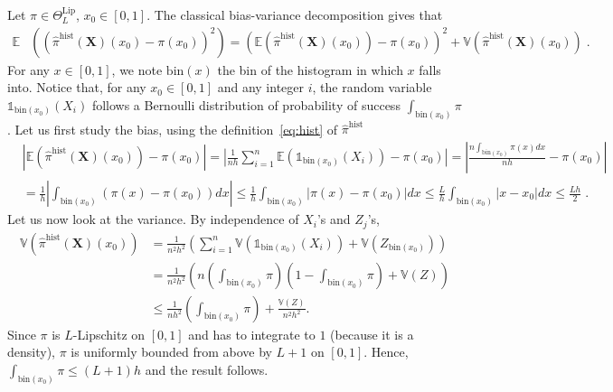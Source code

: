 \documentclass[10pt]{article} %
\def\Ind{\mathds{1}}
\newcommand{\E}[0]{\mathbb{E}}
\newcommand{\V}[0]{\mathbb{V}}
\newcommand\vect[1]{\mathbf{#1}}
\newcommand\p[1]{\left( {#1}\right)}
\newcommand\RG[1]{\textcolor{red}{#1}}
\newcommand\mRG[1]{\marginpar{\tiny\RG{#1}}}
\begin{document}
Let $\pi \in \Theta^{\text{Lip}}_L$, $x_0 \in [0, 1]$. The classical bias-variance decomposition gives that%
\begin{equation*}
\begin{aligned}
    \E&\p{ \p{\hat{\pi}^{\text{hist}}(\vect{X})(x_0) - \pi(x_0)}^2}
    = \p{\E \p{\hat{\pi}^{\text{hist}}(\vect{X})(x_0)} - \pi(x_0)}^2
    + \V \p{\hat{\pi}^{\text{hist}}(\vect{X})(x_0)} \;.
\end{aligned}
\end{equation*}
For any $x \in [0, 1]$, we note $\text{bin}(x)$ the bin of the histogram in which $x$ falls into. Notice that, for any $x_0 \in [0,1]$ and any integer $i$, the random variable $\Ind_{ \text{bin}(x_0)}(X_i)$ follows a Bernoulli distribution of probability of success $\int_{\text{bin}(x_0)} \pi$. Let us first study the bias, using the definition~\eqref{eq:hist} of $\hat{\pi}^{\text{hist}}$
\begin{equation*}
    \begin{aligned}
        &\left| \E\p{\hat{\pi}^{\text{hist}}(\vect{X})(x_0)} - \pi(x_0) \right|
        =
        \left| \frac{1}{nh} \sum_{i = 1}^n \E\p{\Ind_{ \text{bin}(x_0)}(X_i)}   - \pi(x_0) \right|
        =
        \left| \frac{n\int_{\text{bin}(x_0)} \pi(x)dx}{nh} - \pi(x_0) \right| \\
        &=
        \frac{1}{h} \left| \int_{\text{bin}(x_0)} (\pi(x) - \pi(x_0)) dx \right| 
        \leq 
        \frac{1}{h} \int_{\text{bin}(x_0)} \left|  \pi(x) - \pi(x_0) \right| dx
        \leq 
        \frac{L}{h} \int_{\text{bin}(x_0)} \left|  x - x_0 \right| dx
        \leq 
        \frac{L h}{2} \;.
    \end{aligned}
\end{equation*}
Let us now look at the variance. By independence of $X_i$'s and $Z_j$'s, 
\begin{equation*}
    \begin{aligned}
        \V\p{\hat{\pi}^{\text{hist}}(\vect{X})(x_0)} 
        &=
        \frac{1}{n^2h^2} \p{\sum_{i = 1}^n \V\p{\Ind_{ \text{bin}(x_0)}(X_i)} + \V \p{Z_{\text{bin}(x_0)}} } \\
        &=
        \frac{1}{n^2h^2} \p{n \p{\int_{\text{bin}(x_0)} \pi }\p{1-\int_{\text{bin}(x_0)} \pi} + \V \p{Z} } \\ 
        &\leq \frac{1}{n h^2} \p{\int_{\text{bin}(x_0)} \pi } + \frac{\V \p{Z}}{n^2h^2}.
    \end{aligned}
\end{equation*}
Since $\pi$ is $L$-Lipschitz on $[0, 1]$ and has to integrate to $1$ (because it is a density), $\pi$ is uniformly bounded from above by $L+1$ on $[0, 1]$. Hence, $\int_{\text{bin}(x_0)} \pi \leq (L+1) h$ and the result follows.
\end{document}

